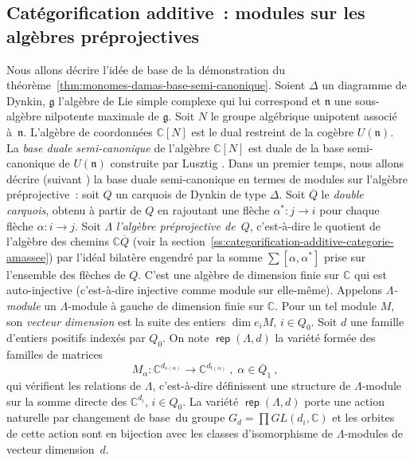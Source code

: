 \documentclass[brochure,12pt]{bourbaki}
\newcommand{\og}{\guillemotleft\hspace*{1pt}}
\newcommand{\fg}{\hspace*{1pt}\guillemotright}
\newcommand{\ko}{\: , \;}
\newcommand{\ol}[1]{\overline{#1}}
\numberwithin{equation}{subsection}
\numberwithin{theorem}{section}
\newcommand{\opname}[1]{\operatorname{\mathsf{#1}}}
\newcommand{\rep}{\opname{rep}\nolimits}
\renewcommand{\rep}{\opname{rep}\nolimits}
\newcommand{\C}{\mathbb{C}}
\begin{document}
\subsection{Cat\'egorification additive~: modules sur les alg\`ebres pr\'eprojectives}
\label{ss:categorification-additive-preprojective}

Nous allons d\'ecrire l'id\'ee de base de la d\'emonstration du
th\'eor\`eme~\ref{thm:monomes-damas-base-semi-canonique}.
Soient $\Delta$ un diagramme de Dynkin, $\mathfrak{g}$ l'alg\`ebre
de Lie simple complexe qui lui correspond et $\mathfrak{n}$
une sous-alg\`ebre nilpotente maximale de $\mathfrak{g}$.
Soit $N$ le groupe alg\'ebrique unipotent associ\'e \`a~$\mathfrak{n}$.
L'alg\`ebre de coordonn\'ees $\C[N]$ est le dual restreint
de la cog\`ebre $U(\mathfrak{n})$.
La {\em base duale semi-canonique} de l'alg\`ebre $\C[N]$ est
duale de la base semi-canonique de $U(\mathfrak{n})$ construite
par Lusztig \cite{Lusztig00}. Dans un premier temps,
nous allons d\'ecrire (suivant \cite{GeissLeclercSchroeer06})
la base duale semi-canonique en termes de
modules sur l'alg\`ebre pr\'eprojective~:
soit $Q$ un carquois de Dynkin de type $\Delta$. Soit $\ol{Q}$
le {\em double carquois}, obtenu \`a partir de $Q$ en rajoutant une fl\`eche
$\alpha^*: j\to i$ pour chaque fl\`eche $\alpha: i\to j$. Soit $\Lambda$
{\em l'alg\`ebre pr\'eprojective de~$Q$}, c'est-\`a-dire le quotient de
l'alg\`ebre des chemins $\C \ol{Q}$ (voir
la section~\ref{ss:categorification-additive-categorie-amassee})
par l'id\'eal bilat\`ere engendr\'e par la somme $\sum [\alpha, \alpha^*]$
prise sur l'ensemble des fl\`eches de $Q$. C'est une alg\`ebre de dimension
finie sur $\C$ qui est auto-injective (c'est-\`a-dire injective comme module sur elle-m\^eme).
Appelons {\em $\Lambda$-module} un $\Lambda$-module \`a gauche de dimension
finie sur $\C$. Pour un tel module $M$, son {\em vecteur dimension}
est la suite des entiers $\dim e_i M$, $i\in Q_0$. Soit $d$ une famille
d'entiers positifs index\'es par $Q_0$. On note
$\rep(\Lambda, d)$ la vari\'et\'e form\'ee des familles
de matrices
\[
M_\alpha : \C^{d_{s(\alpha)}} \to \C^{d_{t(\alpha)}} \ko \alpha\in \ol{Q}_1 \ko
\]
qui v\'erifient les relations de $\Lambda$, c'est-\`a-dire
d\'efinissent une structure de $\Lambda$-module sur la somme directe
des $\C^{d_i}$, $i\in Q_0$.  La vari\'et\'e $\rep(\Lambda, d)$ porte
une action naturelle par \og changement de base\fg\ du groupe $G_d = \prod
GL(d_i,\C)$ et les orbites de cette action sont en bijection avec les
classes d'isomorphisme de $\Lambda$-modules de vecteur dimension~$d$.
\end{document}
